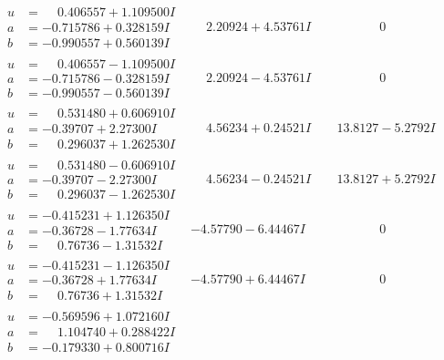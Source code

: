\documentclass[1p]{elsarticle_modified}
\theoremstyle{definition}
\begin{document}
$$\begin{array}{c|c|c}
\begin{aligned}
u &= \phantom{-}0.406557 + 1.109500 I \\
a &= -0.715786 + 0.328159 I \\
b &= -0.990557 + 0.560139 I\end{aligned}
 & \phantom{-}2.20924 + 4.53761 I & \phantom{-0.000000 } 0 \\ \hline\begin{aligned}
u &= \phantom{-}0.406557 - 1.109500 I \\
a &= -0.715786 - 0.328159 I \\
b &= -0.990557 - 0.560139 I\end{aligned}
 & \phantom{-}2.20924 - 4.53761 I & \phantom{-0.000000 } 0 \\ \hline\begin{aligned}
u &= \phantom{-}0.531480 + 0.606910 I \\
a &= -0.39707 + 2.27300 I \\
b &= \phantom{-}0.296037 + 1.262530 I\end{aligned}
 & \phantom{-}4.56234 + 0.24521 I & \phantom{-}13.8127 - 5.2792 I \\ \hline\begin{aligned}
u &= \phantom{-}0.531480 - 0.606910 I \\
a &= -0.39707 - 2.27300 I \\
b &= \phantom{-}0.296037 - 1.262530 I\end{aligned}
 & \phantom{-}4.56234 - 0.24521 I & \phantom{-}13.8127 + 5.2792 I \\ \hline\begin{aligned}
u &= -0.415231 + 1.126350 I \\
a &= -0.36728 - 1.77634 I \\
b &= \phantom{-}0.76736 - 1.31532 I\end{aligned}
 & -4.57790 - 6.44467 I & \phantom{-0.000000 } 0 \\ \hline\begin{aligned}
u &= -0.415231 - 1.126350 I \\
a &= -0.36728 + 1.77634 I \\
b &= \phantom{-}0.76736 + 1.31532 I\end{aligned}
 & -4.57790 + 6.44467 I & \phantom{-0.000000 } 0 \\ \hline\begin{aligned}
u &= -0.569596 + 1.072160 I \\
a &= \phantom{-}1.104740 + 0.288422 I \\
b &= -0.179330 + 0.800716 I\end{aligned}

\end{array}$$
\end{document}
